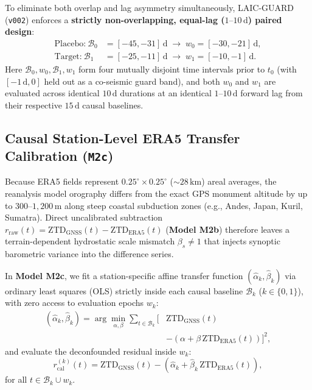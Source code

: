 ﻿\documentclass[journal]{IEEEtran}
\begin{document}
To eliminate both overlap and lag asymmetry simultaneously, LAIC-GUARD (\texttt{v002}) enforces a \textbf{strictly non-overlapping, equal-lag ($1\text{--}10\,\text{d}$) paired design}:
\begin{align}
    \text{Placebo:}\ \mathcal{B}_0 &= [-45, -31]\,\text{d} \;\to\; w_0 = [-30, -21]\,\text{d}, \label{eq:pair_plac} \\
    \text{Target:}\ \mathcal{B}_1 &= [-25, -11]\,\text{d} \;\to\; w_1 = [-10, -1]\,\text{d}. \label{eq:pair_targ}
\end{align}
Here $\mathcal{B}_0, w_0, \mathcal{B}_1, w_1$ form four mutually disjoint time intervals prior to $t_0$ (with $[-1\,\text{d}, 0]$ held out as a co-seismic guard band), and both $w_0$ and $w_1$ are evaluated across identical $10\,\text{d}$ durations at an identical $1\text{--}10\,\text{d}$ forward lag from their respective $15\,\text{d}$ causal baselines.

\subsection{Causal Station-Level ERA5 Transfer Calibration (\texttt{M2c})}
Because ERA5 fields represent $0.25^\circ \times 0.25^\circ$ ($\sim 28\,\text{km}$) areal averages, the reanalysis model orography differs from the exact GPS monument altitude by up to $300\text{--}1{,}200\,\text{m}$ along steep coastal subduction zones (e.g., Andes, Japan, Kuril, Sumatra). Direct uncalibrated subtraction $r_{\text{raw}}(t) = \text{ZTD}_{\text{GNSS}}(t) - \text{ZTD}_{\text{ERA5}}(t)$ (\textbf{Model M2b}) therefore leaves a terrain-dependent hydrostatic scale mismatch $\beta_s \ne 1$ that injects synoptic barometric variance into the difference series.

In \textbf{Model M2c}, we fit a station-specific affine transfer function $(\hat{\alpha}_k, \hat{\beta}_k)$ via ordinary least squares (OLS) strictly inside each causal baseline $\mathcal{B}_k$ ($k \in \{0, 1\}$), with zero access to evaluation epochs $w_k$:
\begin{equation}
\begin{aligned}
    (\hat{\alpha}_k, \hat{\beta}_k) = \arg\min_{\alpha,\beta} \sum_{t \in \mathcal{B}_k} \Big[ &\text{ZTD}_{\text{GNSS}}(t) \\
    &- \left(\alpha + \beta \, \text{ZTD}_{\text{ERA5}}(t)\right) \Big]^2,
\end{aligned}
\label{eq:ols_era5}
\end{equation}
and evaluate the deconfounded residual inside $w_k$:
\begin{equation}
    r_{\text{cal}}^{(k)}(t) = \text{ZTD}_{\text{GNSS}}(t) - \left(\hat{\alpha}_k + \hat{\beta}_k \, \text{ZTD}_{\text{ERA5}}(t)\right),
    \label{eq:res_cal}
\end{equation}
for all $t \in \mathcal{B}_k \cup w_k$.
\end{document}
